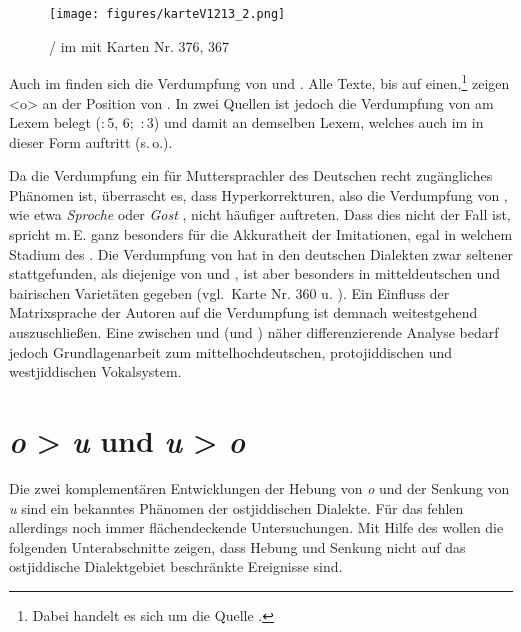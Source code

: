 \begin{figure}  
		 
\texttt{[image: figures/karteV1213\_2.png]}
		\caption{\label{karteV1213}  / im  mit  Karten Nr. 376, 367}
		\end{figure}


  
  
  
 Auch im  finden sich die Verdumpfung von  und . Alle Texte, bis auf einen,\footnote{Dabei handelt es sich um die Quelle .}  zeigen <o> an der Position von . In zwei Quellen ist jedoch die Verdumpfung von  am Lexem  belegt (:\,5, 6;\, :\,3) und damit an demselben Lexem, welches auch im   in dieser Form auftritt (s.\,o.). 
 
 
 Da die Verdumpfung ein für Muttersprachler des Deutschen recht zugängliches Phänomen ist, überrascht es, dass Hyperkorrekturen, also die Verdumpfung von , wie etwa \textit{Sproche}  oder \textit{Gost} , nicht häufiger auftreten. Dass dies nicht der Fall ist, spricht m.\,E. ganz besonders für die Akkuratheit der Imitationen, egal in welchem Stadium des \hai{{\LiJi}}. Die Verdumpfung von  hat in den deutschen Dialekten zwar seltener stattgefunden, als diejenige von  und , ist aber besonders in mitteldeutschen und bairischen Varietäten gegeben (vgl.\,  Karte Nr. 360   u.  ). Ein Einfluss der Matrixsprache der Autoren auf die Verdumpfung ist demnach weitestgehend auszuschließen. Eine zwischen  und  (und ) näher differenzierende Analyse bedarf jedoch Grundlagenarbeit zum mittelhochdeutschen, protojiddischen und westjiddischen Vokalsystem.
  
   
  
 \section{\textit{o} > \textit{u} und \textit{u} > \textit{o}}\label{o_u_zeug}

Die zwei komplementären Entwicklungen der Hebung von \textit{o} und der Senkung von \textit{u} sind ein bekanntes Phänomen der ostjiddischen Dialekte. Für das \hai{{\WJ}} fehlen allerdings noch immer flächendeckende Untersuchungen. Mit Hilfe des \hai{{\LiJi}} wollen die folgenden Unterabschnitte zeigen, dass Hebung und Senkung nicht auf das ostjiddische Dialektgebiet beschränkte Ereignisse sind.



